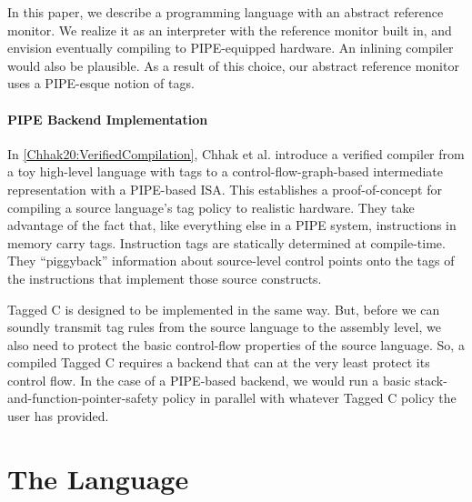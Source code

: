 \documentclass[acmsmall,review,anonymous]{acmart}\settopmatter{printfolios=true,printccs=false,printacmref=false}
\begin{document}
In this paper, we describe a programming language with an abstract reference monitor.
We realize it as an interpreter with the reference monitor built in, and envision
eventually compiling to PIPE-equipped hardware. An inlining compiler would also be plausible.
As a result of this choice, our abstract reference monitor uses a PIPE-esque notion of
tags.

\paragraph{PIPE Backend Implementation}

In \cref{Chhak20:VerifiedCompilation}, Chhak et al. introduce a verified compiler from a toy
high-level language with tags
to a control-flow-graph-based intermediate representation with a PIPE-based
ISA. This establishes a proof-of-concept for compiling a source language's tag policy to
realistic hardware. They take advantage of the fact that, like everything else in a PIPE system,
instructions in memory carry tags. Instruction tags are statically determined at compile-time.
They ``piggyback'' information about source-level control points onto the tags of the instructions
that implement those source constructs.

Tagged C is designed to be implemented in the same way. But, before we can soundly transmit
tag rules from the source language to the assembly level, we also need to protect the basic
control-flow properties of the source language. So, a compiled Tagged C requires a backend that
can at the very least protect its control flow. In the case of a PIPE-based backend, we would
run a basic stack-and-function-pointer-safety policy in parallel with whatever Tagged C policy
the user has provided.

\section{The Language}
\end{document}
